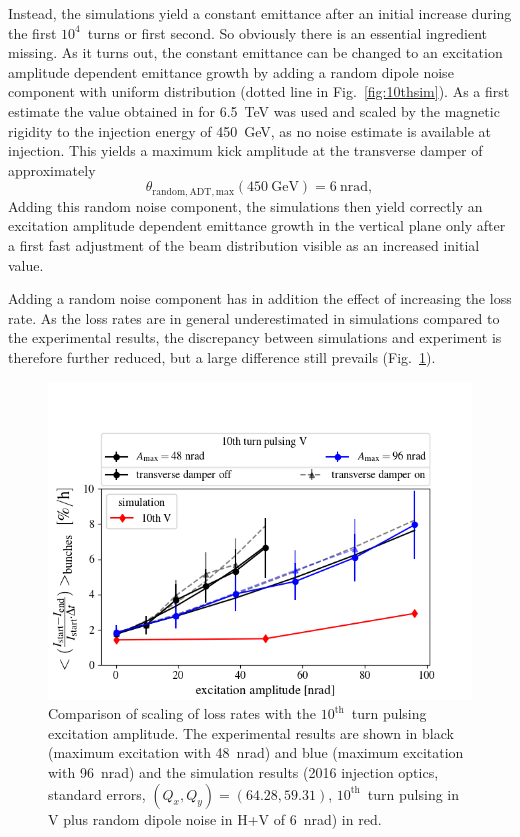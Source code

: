 \documentclass[%
 reprint,
 amsmath,amssymb,
 aps,
prstab,
]{revtex4-1}
\begin{document}
Instead, the simulations yield a constant emittance after an initial increase during the first $10^4$~turns or first second. So obviously there is an essential ingredient missing. As it turns out, the constant emittance can be changed to an excitation amplitude dependent emittance growth by adding a random dipole noise component with uniform distribution (dotted line in Fig.~\ref{fig:10thsim}). As a first estimate the value obtained in \cite{md1433_noise_top_energy,md_noise_bbLHC} for 6.5~TeV was used and scaled by the magnetic rigidity to the injection energy of 450~GeV, as no noise estimate is available at injection. This yields a maximum kick amplitude at the transverse damper of approximately
\begin{equation}
\theta_{\mathrm{random,ADT,max}}(\mathrm{450~GeV}) = 6~\mathrm{nrad},
\end{equation}
Adding this random noise component, the simulations then yield correctly an excitation amplitude dependent emittance growth in the vertical plane only after a first fast adjustment of the beam distribution visible as an increased initial value.

Adding a random noise component has in addition the effect of increasing the loss rate. As the loss rates are in general underestimated in simulations compared to the experimental results, the discrepancy between simulations and experiment is therefore further reduced, but a large difference still prevails (Fig.~\ref{fig:10thexpsim}).
\begin{figure}[h]
		\centering
		\includegraphics[width=1.0\linewidth]{scale_amp_10v_ran_lbllong_sim.png}
	\caption{\label{fig:10thexpsim} Comparison of scaling of loss rates with the $10^{\mathrm{th}}$~turn pulsing excitation amplitude. The experimental results are shown in black (maximum excitation with 48~nrad) and blue (maximum excitation with 96~nrad) and the simulation results (2016 injection optics, standard errors, $(Q_x,Q_y)=(64.28,59.31)$, $10^{\mathrm{th}}$~turn pulsing in V plus random dipole noise in H+V of 6~nrad) in red.}
\end{figure}
\end{document}
